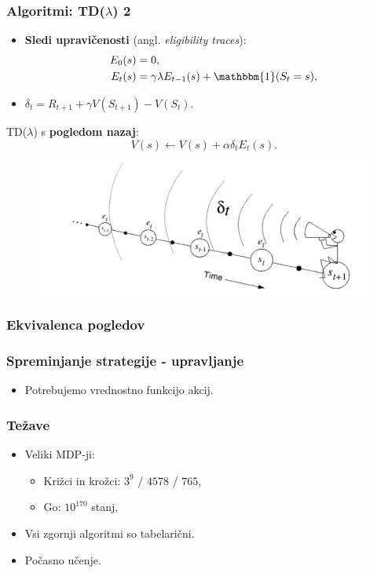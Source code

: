 \documentclass{beamer}    %
\begin{document}
\begin{frame}
    \frametitle{Algoritmi: TD($\lambda$) 2}
    \begin{itemize}
        \item \textbf{Sledi upravičenosti} (angl. \textit{eligibility traces}):
        \begin{align*}
            E_0(s) &= 0, \\
            E_t(s) &= \gamma \lambda E_{t-1}(s) + \mathbbm{1}(S_t = s),
        \end{align*}
        \item $\delta_t = R_{t+1} + \gamma V(S_{t+1}) - V(S_t).$
    \end{itemize}

    \medskip
    \medskip
    \medskip
    TD($\lambda$) s \textbf{pogledom nazaj}: 
    $$
    V(s) \leftarrow V(s) + \alpha \delta_t E_t(s).
    $$
    \begin{figure}[b]
        \includegraphics[scale=0.45]{slike/pogled-nazaj.png}
    \end{figure}
\end{frame}


\begin{frame}
    \frametitle{Ekvivalenca pogledov}
\end{frame}


\begin{frame}
    \frametitle{Spreminjanje strategije - upravljanje}
    \begin{itemize}
        \item Potrebujemo vrednostno funkcijo akcij. 
    \end{itemize}
\end{frame}


\begin{frame}
    \frametitle{Težave}
    \begin{itemize}
        \item Veliki MDP-ji:
                \begin{itemize}
                    \item Križci in krožci: $3^9$ / $4578$ / $765$, 
                    \item Go: $10^{170}$ stanj, 
                \end{itemize}
        \item Vsi zgornji algoritmi so tabelarični.
        \item Počasno učenje.
    \end{itemize}
\end{frame}
\end{document}
